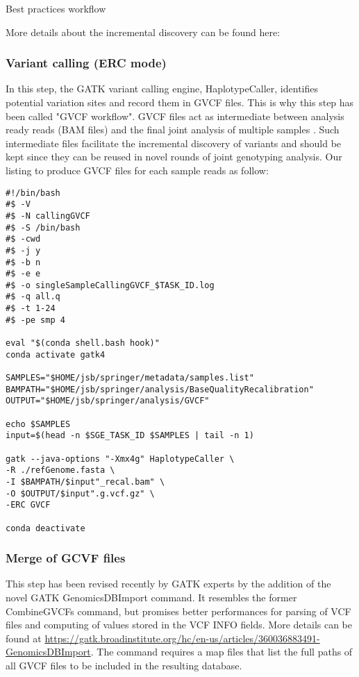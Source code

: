 Best practices workflow 


More details about the incremental discovery can be found here:

\subsubsection{Variant calling (ERC mode)}


In this step, the GATK variant calling engine, HaplotypeCaller, identifies potential variation sites and record them in GVCF files. This is why this step has been called "GVCF workflow". GVCF files act as intermediate between analysis ready reads (BAM files) and the final joint analysis of multiple samples \cite{GATK_jointCalling_1}. Such intermediate files facilitate the incremental discovery of variants and should be kept since they can be reused in novel rounds of joint genotyping analysis. Our listing to produce GVCF files for each sample reads as follow:


\begin{verbatim}
#!/bin/bash
#$ -V
#$ -N callingGVCF
#$ -S /bin/bash
#$ -cwd
#$ -j y
#$ -b n
#$ -e e
#$ -o singleSampleCallingGVCF_$TASK_ID.log
#$ -q all.q
#$ -t 1-24
#$ -pe smp 4

eval "$(conda shell.bash hook)"
conda activate gatk4

SAMPLES="$HOME/jsb/springer/metadata/samples.list"
BAMPATH="$HOME/jsb/springer/analysis/BaseQualityRecalibration"
OUTPUT="$HOME/jsb/springer/analysis/GVCF"

echo $SAMPLES
input=$(head -n $SGE_TASK_ID $SAMPLES | tail -n 1)

gatk --java-options "-Xmx4g" HaplotypeCaller \
-R ./refGenome.fasta \
-I $BAMPATH/$input"_recal.bam" \
-O $OUTPUT/$input".g.vcf.gz" \
-ERC GVCF

conda deactivate
\end{verbatim}





\subsubsection{Merge of GCVF files}

This step has been revised recently by GATK experts by the addition of the novel GATK GenomicsDBImport command. It resembles the former CombineGVCFs command, but promises better performances for parsing of VCF files and computing of values stored in the VCF INFO fields. More details can be found at \href{https://gatk.broadinstitute.org/hc/en-us/articles/360036883491-GenomicsDBImport}{https://gatk.broadinstitute.org/hc/en-us/articles/360036883491-GenomicsDBImport}. The command requires a map files that list the full paths of all GVCF files to be included in the resulting database. 

